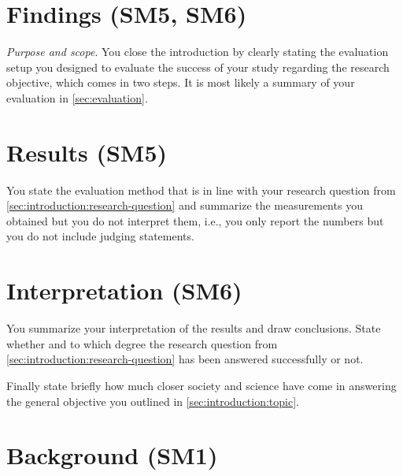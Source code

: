 \documentclass[
  fontsize=10pt,
  numbers=noenddot,
  english,  %
  paper=a5,
  twoside,  %
  DIV=calc,
  headings=small,
  bibliography=totoc,
  listof=totoc,
  draft=false
]{scrbook}
\theoremstyle{break}
\begin{document}
\section{Findings (SM5, SM6)}\label{sec:introduction:results}

\emph{Purpose and scope}.
You close the introduction by clearly stating the evaluation setup you designed to evaluate the success of your study regarding the research objective, which comes in two steps.
It is most likely a summary of your evaluation in \cref{sec:evaluation}.

\section*{Results (SM5)}

You state the evaluation method that is in line with your research question from \cref{sec:introduction:research-question} and summarize the measurements you obtained but you do not interpret them, i.e., you only report the numbers but you do not include judging statements.

\section*{Interpretation (SM6)}

You summarize your interpretation of the results and draw conclusions.
State whether and to which degree the research question from \cref{sec:introduction:research-question} has been answered successfully or not.

Finally state briefly how much closer society and science have come in answering the general objective you outlined in \cref{sec:introduction:topic}.

\section{Background (SM1)}\label{sec:background}
\end{document}
